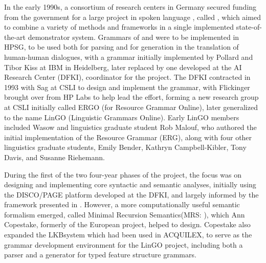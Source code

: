 \documentclass[output=paper
 	        ,biblatex
                ,babelshorthands
                ,newtxmath
                ,draftmode
                ,colorlinks, citecolor=brown
]{langscibook}
\begin{document}
In the early 1990s, a consortium of research centers in Germany secured funding from the  government for a large project in spoken language , called \verbmobil \citep{Wahlster2000a-ed}, which aimed to combine a variety of methods and frameworks in a single implemented state-of-the-art demonstrator system.  Grammars of  and  were to be implemented in HPSG, to be used both for parsing and for generation in the translation of human-human dialogues, with a  grammar initially implemented by Pollard and Tibor Kiss at IBM in Heidelberg, later replaced by one developed  at the  AI Research Center (DFKI), coordinator for the \verbmobil project.  The DFKI contracted in 1993 with Sag at CSLI to design and implement the  grammar, with Flickinger brought over from HP Labs to help lead the effort, forming a new research group at CSLI initially called ERGO (for  Resource Grammar Online), later generalized to the name LinGO (Linguistic Grammars Online).  Early LinGO members included Wasow and linguistics graduate student Rob Malouf, who authored the initial implementation of the  Resource Grammar (ERG), along with four other linguistics graduate students, Emily Bender, Kathryn Campbell-Kibler, Tony Davis, and Susanne Riehemann.

During the first of the two four-year phases of the \verbmobil project, the focus was on designing and implementing core syntactic and semantic analyses, initially using the DISCO/PAGE platform \citep{DISCO94} developed at the DFKI, and largely informed by the framework presented in \citet{ps2}.  However, a more computationally useful semantic formalism emerged, called Minimal Recursion Semantics\indexmrs (MRS: \citealt*{CFPS2005a}), which Ann Copestake, formerly of the European  project, helped to design.  Copestake also expanded the LKB\indexlkb system \citep{Copestake2002a} which had been used in ACQUILEX, to serve as the grammar development environment for the LinGO project, including both a parser and a generator for typed feature structure grammars.
\end{document}
